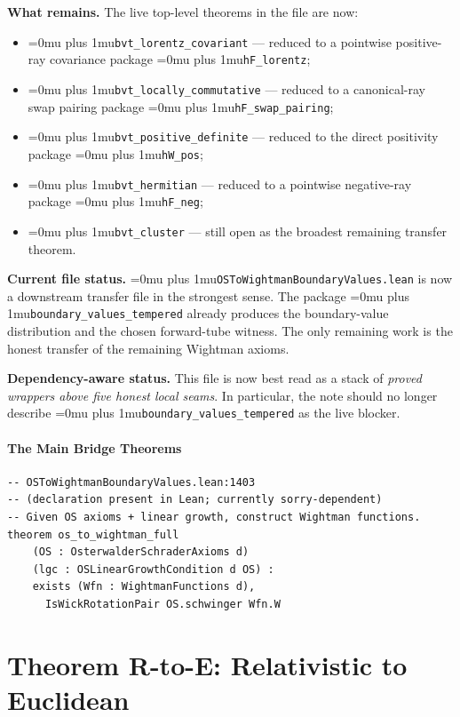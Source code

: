 \documentclass[11pt,a4paper]{article}
\newcommand{\leanfile}[1]{\begingroup\Urlmuskip=0mu plus 1mu\relax\nolinkurl{#1}\endgroup}
\newcommand{\leanname}[1]{\begingroup\Urlmuskip=0mu plus 1mu\relax\nolinkurl{#1}\endgroup}
\begin{document}
\noindent\textbf{What remains.}
The live top-level theorems in the file are now:
\begin{itemize}
\item \leanname{bvt\_lorentz\_covariant} --- reduced to a pointwise positive-ray
  covariance package \leanname{hF\_lorentz};
\item \leanname{bvt\_locally\_commutative} --- reduced to a canonical-ray swap
  pairing package \leanname{hF\_swap\_pairing};
\item \leanname{bvt\_positive\_definite} --- reduced to the direct positivity
  package \leanname{hW\_pos};
\item \leanname{bvt\_hermitian} --- reduced to a pointwise negative-ray package
  \leanname{hF\_neg};
\item \leanname{bvt\_cluster} --- still open as the broadest remaining transfer
  theorem.
\end{itemize}

\medskip\noindent
\textbf{Current file status.}
\leanfile{OSToWightmanBoundaryValues.lean} is now a downstream transfer file in
the strongest sense. The package \leanname{boundary\_values\_tempered} already
produces the boundary-value distribution and the chosen forward-tube witness.
The only remaining work is the honest transfer of the remaining Wightman axioms.

\medskip\noindent
\textbf{Dependency-aware status.}
This file is now best read as a stack of \emph{proved wrappers above five honest
local seams}. In particular, the note should no longer describe
\leanname{boundary\_values\_tempered} as the live blocker.

\subsection{The Main Bridge Theorems}

\begin{lstlisting}
-- OSToWightmanBoundaryValues.lean:1403
-- (declaration present in Lean; currently sorry-dependent)
-- Given OS axioms + linear growth, construct Wightman functions.
theorem os_to_wightman_full
    (OS : OsterwalderSchraderAxioms d)
    (lgc : OSLinearGrowthCondition d OS) :
    exists (Wfn : WightmanFunctions d),
      IsWickRotationPair OS.schwinger Wfn.W
\end{lstlisting}


\part{Theorem R-to-E: Relativistic to Euclidean}
\end{document}
